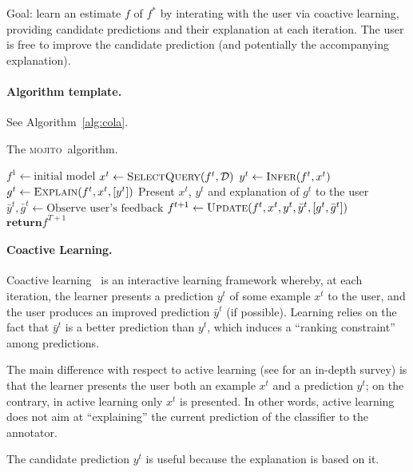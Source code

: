 \documentclass[a4paper,12pt]{article}
\newcommand{\cola}{\textsc{mojito}}
\begin{document}
Goal: learn an estimate $f$ of $f^*$ by interating with the user via coactive
learning, providing candidate predictions and their explanation at each
iteration. The user is free to improve the candidate prediction (and
potentially the accompanying explanation).

\paragraph{Algorithm template.} See Algorithm~\ref{alg:cola}.

\begin{algorithm*}[t]
    \caption{\label{alg:cola} The \cola\ algorithm.}
    \begin{algorithmic}[1]
        \Procedure{\cola}{$\calD$, $\vpsi$, $T$}
            \State $f^1 \gets \text{initial model}$
                \State $x^t \gets \textsc{SelectQuery}(f^t, \mathcal{D})$
                \State $y^t \gets \textsc{Infer}(f^t, x^t)$
                \State $g^t \gets \textsc{Explain}(f^t, x^t,[y^t])$
                \State Present $x^t$, $y^t$ and explanation of $g^t$ to the user
                \State $\bar{y}^t, \bar{g}^t \gets \text{Observe user's feedback}$
                \State $f^{t+1} \gets \textsc{Update}(f^t,x^t,y^t,\bar{y}^t,[g^t,\bar{g}^t])$
            \EndFor
            \State $\textbf{return} f^{T+1}$
        \EndProcedure
    \end{algorithmic}
\end{algorithm*}

\paragraph{Coactive Learning.} Coactive learning~\cite{shivaswamy2015coactive}
is an interactive learning framework whereby, at each iteration, the learner
presents a prediction $y^t$ of some example $x^t$ to the user, and the user
produces an improved prediction $\bar{y}^t$ (if possible). Learning relies on
the fact that $\bar{y}^t$ is a better prediction than $y^t$, which induces a
``ranking constraint'' among predictions.

The main difference with respect to active learning (see
\cite{settles2010active} for an in-depth survey) is that the learner presents
the user both an example $x^t$ and a prediction $y^t$; on the contrary, in
active learning only $x^t$ is presented. In other words, active learning does
not aim at ``explaining'' the current prediction of the classifier to the
annotator.

The candidate prediction $y^t$ is useful because the explanation is based on
it.



\end{document}
